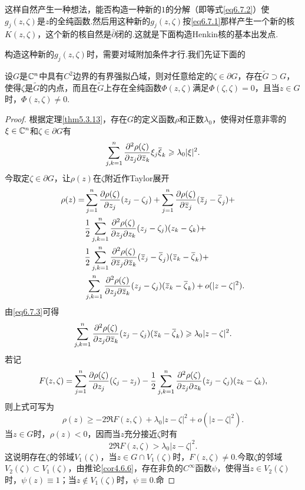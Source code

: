 这样自然产生一种想法，能否构造一种新的$1$的分解（即等式\eqref{eq6.7.2}）使$g_j(z,\zeta)$是$z$的全纯函数.然后用这种新的$g_j(z,\zeta)$按\eqref{eq6.7.1}那样产生一个新的核$K(z,\zeta)$，这个新的核自然是$\bar{\partial}$闭的.这就是下面构造Henkin核的基本出发点.

构造这种新的$g_j(z,\zeta)$时，需要对域附加条件才行.我们先证下面的
\begin{lemma}\label{lem6.7.3}
	设$G$是$\mathbb C^n$中具有$C^2$边界的有界强拟凸域，则对任意给定的$\zeta\in\partial G$，存在$\widetilde{G}\supset G$，使得$\zeta$是$\widetilde{G}$的内点，而且在$\widetilde{G}$上存在全纯函数$\Phi(z,\zeta)$满足$\Phi(\zeta,\zeta)=0$，且当$z\in G$时，$\Phi(z,\zeta)\neq0$.
\end{lemma}
\begin{proof}
	根据定理\ref{thm5.3.13}，存在$G$的定义函数$\rho$和正数$\lambda_0$，使得对任意非零的$\xi\in\mathbb C^n$和$\zeta\in\partial G$有
	\begin{equation}\label{eq6.7.3}
		\sum_{j,k=1}^{n}\frac{\partial^2 \rho(\zeta)}{\partial z_j\partial {}\mkern1mu\overline{\mkern-1muz}_k}\xi_j{}\mkern1mu\overline{\mkern-1mu\xi}_k\geqslant\lambda_0|\xi|^2.
	\end{equation}
	今取定$\zeta\in\partial G$，让$\rho(z)$在$\zeta$附近作Taylor展开
	\begin{align*}
		\rho(z)
		=&\sum_{j=1}^{n}\frac{\partial \rho(\zeta)}{\partial z_j}(z_j-\zeta_j)+\sum_{j=1}^{n}\frac{\partial \rho(\zeta)}{\partial {}\mkern1mu\overline{\mkern-1muz}_j}({}\mkern1mu\overline{\mkern-1muz}_j-{}\mkern1mu\overline{\mkern-1mu\zeta}_j)+\\
		&\frac12\sum_{j,k=1}^{n}\frac{\partial^2 \rho(\zeta)}{\partial z_j\partial z_k}(z_j-\zeta_j)(z_k-\zeta_k)+\\
		&\frac12\sum_{j,k=1}^{n}\frac{\partial^2 \rho(\zeta)}{\partial {}\mkern1mu\overline{\mkern-1muz}_j\partial {}\mkern1mu\overline{\mkern-1muz}_k}({}\mkern1mu\overline{\mkern-1muz}_j-{}\mkern1mu\overline{\mkern-1mu\zeta}_j)({}\mkern1mu\overline{\mkern-1muz}_k-{}\mkern1mu\overline{\mkern-1mu\zeta}_k)+\\
		&\sum_{j,k=1}^{n}\frac{\partial^2 \rho(\zeta)}{\partial z_j\partial {}\mkern1mu\overline{\mkern-1muz}_k}(z_j-\zeta_j)({}\mkern1mu\overline{\mkern-1muz}_k-{}\mkern1mu\overline{\mkern-1mu\zeta}_k)+o(|z-\zeta|^2).
	\end{align*}
	由\eqref{eq6.7.3}可得
	\[\sum_{j,k=1}^{n}\frac{\partial^2 \rho(\zeta)}{\partial z_j\partial {}\mkern1mu\overline{\mkern-1muz}_k}(z_j-\zeta_j)({}\mkern1mu\overline{\mkern-1muz}_k-{}\mkern1mu\overline{\mkern-1mu\zeta}_k)\geqslant\lambda_0|z-\zeta|^2.\]
	若记
	\[F(z,\zeta)=\sum_{j=1}^{n}\frac{\partial \rho(\zeta)}{\partial z_j}(\zeta_j-z_j)-\frac12\sum_{j,k=1}^{n}\frac{\partial^2 \rho(\zeta)}{\partial z_j\partial z_k}(z_j-\zeta_j)(z_k-\zeta_k),\]
	则上式可写为
	\[\rho(z)\ge-2\Re F(z,\zeta)+\lambda_0|z-\zeta|^2+o(|z-\zeta|^2).\]
	当$z\in G$时，$\rho(z)<0$，因而当$z$充分接近$\zeta$时有
	\[2\Re F(z,\zeta)>\lambda_0 |z-\zeta|^2.\]
	这说明存在$\zeta$的邻域$V_1(\zeta)$，当$z\in G\cap V_1(\zeta)$时，$F(z,\zeta)\neq0$.今取$\zeta$的邻域$V_2(\zeta)\subset V_1(\zeta)$，由推论\ref{cor4.6.6}，存在非负的$C^\infty$函数$\psi$，使得当$z\in V_2(\zeta)$时，$\psi(z)\equiv1$；当$z\notin V_1(\zeta)$时，$\psi\equiv0$.命

\end{proof}
